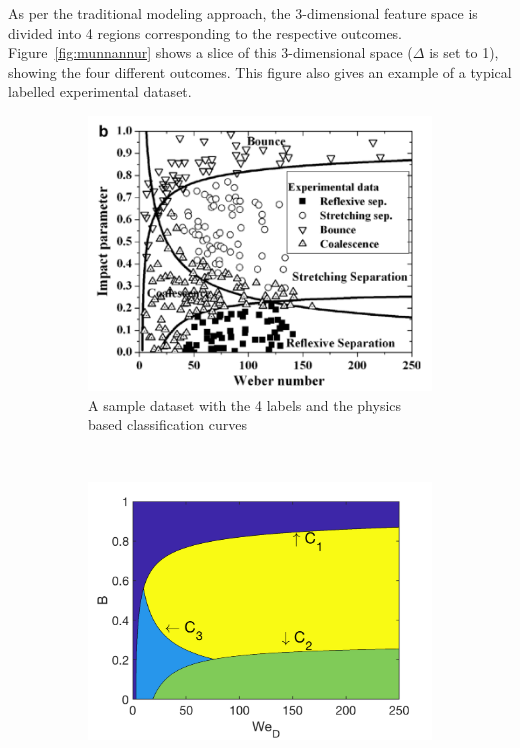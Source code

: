 \documentclass{article}
\begin{document}
As per the traditional modeling approach, the 3-dimensional feature space is divided into 4 regions corresponding to the respective outcomes. Figure~\ref{fig:munnannur} shows a slice of this 3-dimensional space ($\Delta$ is set to 1), showing the four different outcomes. This figure also gives an example of a typical labelled experimental dataset. 



\begin{figure}[h!]
    \centering
    \begin{subfigure}[b]{0.45\textwidth}
        \includegraphics[width=\textwidth]{../figures/munnannur.png}
        \caption{A sample dataset with the 4 labels and the physics based classification curves}
        \label{fig:munnannur_a}
    \end{subfigure}
    ~ %
    \begin{subfigure}[b]{0.45\textwidth}
        \includegraphics[width=\textwidth]{../figures/regimes.png}

\end{subfigure}
\end{figure}
\end{document}
